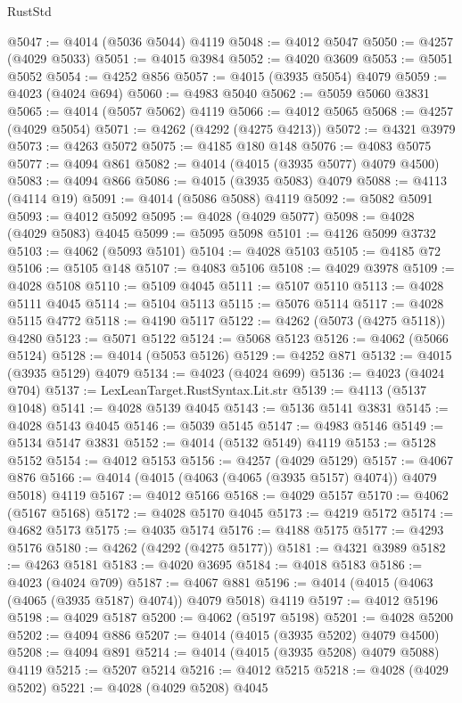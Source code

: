 \begin{lexlean}{RustStd}
\begin{coremodule}
@5047 := @4014 (@5036 @5044) @4119
@5048 := @4012 @5047
@5050 := @4257 (@4029 @5033)
@5051 := @4015 @3984
@5052 := @4020 @3609
@5053 := @5051 @5052
@5054 := @4252 @856
@5057 := @4015 (@3935 @5054) @4079
@5059 := @4023 (@4024 @694)
@5060 := @4983 @5040
@5062 := @5059 @5060 @3831
@5065 := @4014 (@5057 @5062) @4119
@5066 := @4012 @5065
@5068 := @4257 (@4029 @5054)
@5071 := @4262 (@4292 (@4275 @4213))
@5072 := @4321 @3979
@5073 := @4263 @5072
@5075 := @4185 @180 @148
@5076 := @4083 @5075
@5077 := @4094 @861
@5082 := @4014 (@4015 (@3935 @5077) @4079 @4500)
@5083 := @4094 @866
@5086 := @4015 (@3935 @5083) @4079
@5088 := @4113 (@4114 @19)
@5091 := @4014 (@5086 @5088) @4119
@5092 := @5082 @5091
@5093 := @4012 @5092
@5095 := @4028 (@4029 @5077)
@5098 := @4028 (@4029 @5083) @4045
@5099 := @5095 @5098
@5101 := @4126 @5099 @3732
@5103 := @4062 (@5093 @5101)
@5104 := @4028 @5103
@5105 := @4185 @72
@5106 := @5105 @148
@5107 := @4083 @5106
@5108 := @4029 @3978
@5109 := @4028 @5108
@5110 := @5109 @4045
@5111 := @5107 @5110
@5113 := @4028 @5111 @4045
@5114 := @5104 @5113
@5115 := @5076 @5114
@5117 := @4028 @5115 @4772
@5118 := @4190 @5117
@5122 := @4262 (@5073 (@4275 @5118)) @4280
@5123 := @5071 @5122
@5124 := @5068 @5123
@5126 := @4062 (@5066 @5124)
@5128 := @4014 (@5053 @5126)
@5129 := @4252 @871
@5132 := @4015 (@3935 @5129) @4079
@5134 := @4023 (@4024 @699)
@5136 := @4023 (@4024 @704)
@5137 := LexLeanTarget.RustSyntax.Lit.str
@5139 := @4113 (@5137 @1048)
@5141 := @4028 @5139 @4045
@5143 := @5136 @5141 @3831
@5145 := @4028 @5143 @4045
@5146 := @5039 @5145
@5147 := @4983 @5146
@5149 := @5134 @5147 @3831
@5152 := @4014 (@5132 @5149) @4119
@5153 := @5128 @5152
@5154 := @4012 @5153
@5156 := @4257 (@4029 @5129)
@5157 := @4067 @876
@5166 := @4014 (@4015 (@4063 (@4065 (@3935 @5157) @4074)) @4079 @5018) @4119
@5167 := @4012 @5166
@5168 := @4029 @5157
@5170 := @4062 (@5167 @5168)
@5172 := @4028 @5170 @4045
@5173 := @4219 @5172
@5174 := @4682 @5173
@5175 := @4035 @5174
@5176 := @4188 @5175
@5177 := @4293 @5176
@5180 := @4262 (@4292 (@4275 @5177))
@5181 := @4321 @3989
@5182 := @4263 @5181
@5183 := @4020 @3695
@5184 := @4018 @5183
@5186 := @4023 (@4024 @709)
@5187 := @4067 @881
@5196 := @4014 (@4015 (@4063 (@4065 (@3935 @5187) @4074)) @4079 @5018) @4119
@5197 := @4012 @5196
@5198 := @4029 @5187
@5200 := @4062 (@5197 @5198)
@5201 := @4028 @5200
@5202 := @4094 @886
@5207 := @4014 (@4015 (@3935 @5202) @4079 @4500)
@5208 := @4094 @891
@5214 := @4014 (@4015 (@3935 @5208) @4079 @5088) @4119
@5215 := @5207 @5214
@5216 := @4012 @5215
@5218 := @4028 (@4029 @5202)
@5221 := @4028 (@4029 @5208) @4045

\end{coremodule}
\end{lexlean}
